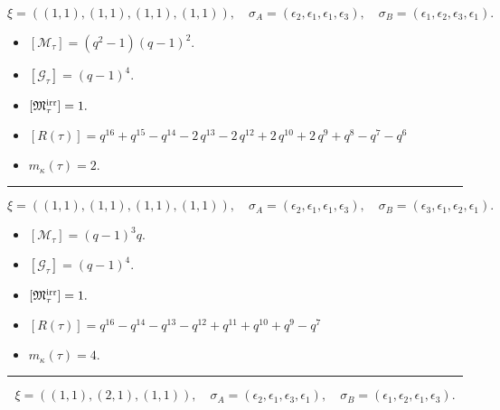 \documentclass[10pt,a4paper]{amsart}
\begin{document}
$$\xi = ({(1, 1)}, {(1, 1), (1, 1)}, {(1, 1)}),\quad \sigma_A = ({{\epsilon_2}}, {{\epsilon_1}, {\epsilon_1}}, {{\epsilon_3}}),\quad \sigma_B = ({{\epsilon_1}}, {{\epsilon_2}, {\epsilon_3}}, {{\epsilon_1}}).$$

\begin{itemize}
 \item $[\mathcal{M}_{\tau}] = {\left(q^{2} - 1\right)} {\left(q - 1\right)}^{2} .$

 \item $[\mathcal{G}_{\tau}] = {\left(q - 1\right)}^{4} .$

 \item $[{\frak M}_{\tau}^{\textrm{irr}}] = 1 .$

 \item $[R(\tau)] = q^{16} + q^{15} - q^{14} - 2 \, q^{13} - 2 \, q^{12} + 2 \, q^{10} + 2 \, q^{9} + q^{8} - q^{7} - q^{6} $

 \item $m_{\kappa}(\tau) = 2 .$

 \end{itemize}
\noindent\rule{8cm}{0.4pt}

$$\xi = ({(1, 1)}, {(1, 1), (1, 1)}, {(1, 1)}),\quad \sigma_A = ({{\epsilon_2}}, {{\epsilon_1}, {\epsilon_1}}, {{\epsilon_3}}),\quad \sigma_B = ({{\epsilon_3}}, {{\epsilon_1}, {\epsilon_2}}, {{\epsilon_1}}).$$

\begin{itemize}
 \item $[\mathcal{M}_{\tau}] = {\left(q - 1\right)}^{3} q .$

 \item $[\mathcal{G}_{\tau}] = {\left(q - 1\right)}^{4} .$

 \item $[{\frak M}_{\tau}^{\textrm{irr}}] = 1 .$

 \item $[R(\tau)] = q^{16} - q^{14} - q^{13} - q^{12} + q^{11} + q^{10} + q^{9} - q^{7} $

 \item $m_{\kappa}(\tau) = 4 .$

 \end{itemize}
\noindent\rule{8cm}{0.4pt}

$$\xi = ({(1, 1)}, {(2, 1)}, {(1, 1)}),\quad \sigma_A = ({{\epsilon_2}}, {{\epsilon_1, \epsilon_3}}, {{\epsilon_1}}),\quad \sigma_B = ({{\epsilon_1}}, {{\epsilon_2, \epsilon_1}}, {{\epsilon_3}}).$$
\end{document}

